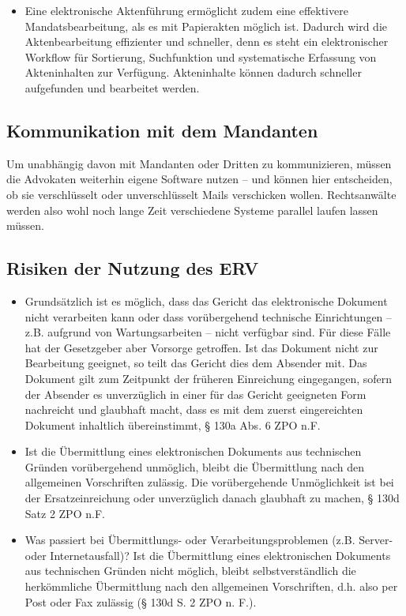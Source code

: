 \begin{itemize}
\item Eine elektronische Aktenführung ermöglicht zudem eine effektivere Mandatsbearbeitung, als es mit Papierakten möglich ist. Dadurch wird die Aktenbearbeitung effizienter und schneller, denn es steht ein elektronischer Workflow für Sortierung, Suchfunktion und systematische Erfassung von Akteninhalten zur Verfügung. Akteninhalte können dadurch schneller aufgefunden und bearbeitet werden.
\end{itemize}

\subsection{Kommunikation mit dem Mandanten}
Um unabhängig davon mit Mandanten oder Dritten zu kommunizieren, müssen die Advokaten weiterhin eigene Software nutzen – und können hier entscheiden, ob sie verschlüsselt oder unverschlüsselt Mails verschicken wollen. Rechtsanwälte werden also wohl noch lange Zeit verschiedene Systeme parallel laufen lassen müssen.

\subsection{Risiken der Nutzung des ERV}
\begin{itemize}
\item Grundsätzlich ist es möglich, dass das Gericht das elektronische Dokument nicht verarbeiten kann oder dass vorübergehend technische Einrichtungen – z.B. aufgrund von Wartungsarbeiten – nicht verfügbar sind. Für diese Fälle hat der Gesetzgeber aber Vorsorge getroffen. Ist das Dokument nicht zur Bearbeitung geeignet, so teilt das Gericht dies dem Absender mit. Das Dokument gilt zum Zeitpunkt der früheren Einreichung eingegangen, sofern der Absender es unverzüglich in einer für das Gericht geeigneten Form nachreicht und glaubhaft macht, dass es mit dem zuerst eingereichten Dokument inhaltlich übereinstimmt, § 130a Abs. 6 ZPO n.F.
\item Ist die Übermittlung eines elektronischen Dokuments aus technischen Gründen vorübergehend unmöglich, bleibt die Übermittlung nach den allgemeinen Vorschriften zulässig. Die vorübergehende Unmöglichkeit ist bei der Ersatzeinreichung oder unverzüglich danach glaubhaft zu machen, § 130d Satz 2 ZPO n.F.
\item Was passiert bei Übermittlungs- oder Verarbeitungsproblemen (z.B. Server- oder Internetausfall)? Ist die Übermittlung eines elektronischen Dokuments aus technischen Gründen nicht möglich, bleibt selbstverständlich die herkömmliche Übermittlung nach den allgemeinen Vorschriften, d.h. also per Post oder Fax zulässig (§ 130d S. 2 ZPO n. F.).
\end{itemize}

